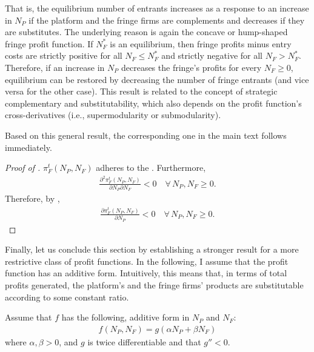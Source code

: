 That is, the equilibrium number of entrants increases as a response to an increase in $N_P$ if the platform and the fringe firms are complements and decreases if they are substitutes.
The underlying reason is again the concave or hump-shaped fringe profit function.
If $N_F^*$ is an equilibrium, then fringe profits minus entry costs are strictly positive for all $N_F \leq N_F^*$ and strictly negative for all $N_F > N_F^*$.
Therefore, if an increase in $N_P$ decreases the fringe's profits for every $N_F \geq 0$, equilibrium can be restored by decreasing the number of fringe entrants (and vice versa for the other case).
This result is related to the concept of strategic complementary and substitutability, which also depends on the profit function's cross-derivatives (i.e., supermodularity or submodularity).

Based on this general result, the corresponding one in the main text follows immediately.
\begin{proof}[Proof of ]
    $\pi^t_F(N_P ,N_F)$ adheres to the .
    Furthermore, 
    \begin{align*}
        \frac{\partial^2 \pi^t_F(N_P ,N_F)}{\partial N_P \partial N_F} < 0 \quad \forall\, N_P, N_F \geq 0.
    \end{align*}
    Therefore, by ,
    \begin{align*}
        \frac{\partial \pi^t_F(N_P, N_F)}{\partial N_P} < 0 \quad \forall\, N_P, N_F \geq 0.
    \end{align*}
\end{proof}

Finally, let us conclude this section by establishing a stronger result for a more restrictive class of profit functions.
In the following, I assume that the profit function has an additive form.
Intuitively, this means that, in terms of total profits generated, the platform's and the fringe firms' products are substitutable according to some constant ratio.
\begin{assumption}
    \label{ass:additive_profit}
    Assume that $f$ has the following, additive form in $N_P$ and $N_F$:
    \begin{align*}
        f(N_P, N_F) = g(\alpha N_P + \beta N_F)
    \end{align*}
    where $\alpha, \beta > 0$, and $g$ is twice differentiable and that $g'' < 0$.
\end{assumption}

